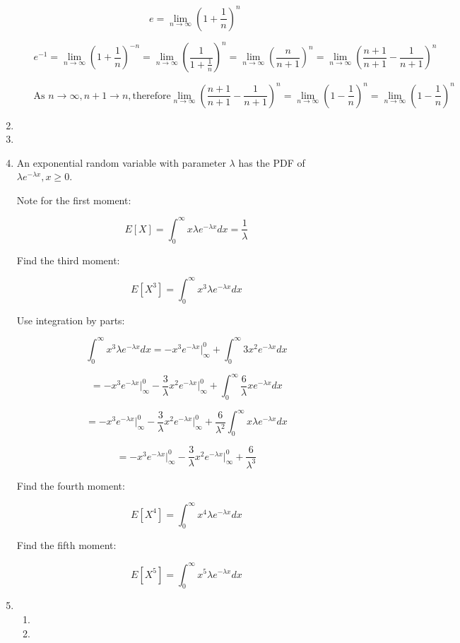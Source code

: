 \documentclass[11pt,letterpaper,titlepage]{article}
\begin{document}
\begin{enumerate}
\begin{enumerate}
        $$ e = \lim_{n\to\infty} (1 + \frac{1}{n})^n $$
        
        $$ e^{-1} = \lim_{n\to\infty} (1 + \frac{1}{n})^{-n} = \lim_{n\to\infty} (\frac{1}{1+\frac{1}{n}})^{n} = \lim_{n\to\infty} (\frac{n}{n+1})^{n} = \lim_{n\to\infty} (\frac{n+1}{n+1} - \frac{1}{n+1})^{n} $$
        
        $$ \text{As } n \to\infty, n+1 \to n, \text{therefore} \lim_{n\to\infty} (\frac{n+1}{n+1} - \frac{1}{n+1})^{n} = \lim_{n\to\infty} (1 - \frac{1}{n})^{n} = \lim_{n\to\infty} (1-\frac{1}{n})^n $$ 
        
    \end{enumerate}
    
    \item
    
    \item 
    
    \item An exponential random variable with parameter $ \lambda $ has the PDF of $ \lambda e^{-\lambda x}, x \geq 0 $.
    
    Note for the first moment:
    
    $$ E[X] = \int_{0}^{\infty} x \lambda e^{-\lambda x} dx = \frac{1}{\lambda} $$
    
    Find the third moment:
    
    $$ E[X^3] = \int_{0}^{\infty} x^3 \lambda e^{-\lambda x} dx $$
    
    Use integration by parts:
    
    $$ \int_{0}^{\infty} x^3 \lambda e^{-\lambda x} dx = -x^3 e^{-\lambda x}\big|_{\infty}^{0} + \int_{0}^{\infty} 3x^2 e^{-\lambda x} dx $$
    
    $$ = -x^3 e^{-\lambda x}\big|_{\infty}^{0} - \frac{3}{\lambda} x^2 e^{-\lambda x}\big|_{\infty}^{0} + \int_{0}^{\infty} \frac{6}{\lambda} x e^{-\lambda x} dx $$
    
    $$ = -x^3 e^{-\lambda x}\big|_{\infty}^{0} - \frac{3}{\lambda} x^2 e^{-\lambda x}\big|_{\infty}^{0} + \frac{6}{\lambda^2} \int_{0}^{\infty} x \lambda e^{-\lambda x} dx $$
    
    $$ = -x^3 e^{-\lambda x}\big|_{\infty}^{0} - \frac{3}{\lambda} x^2 e^{-\lambda x}\big|_{\infty}^{0} + \frac{6}{\lambda^3} $$
    
    Find the fourth moment:
    
    $$ E[X^4] = \int_{0}^{\infty} x^4 \lambda e^{-\lambda x} dx $$
    
    Find the fifth moment:
    
    $$ E[X^5] = \int_{0}^{\infty} x^5 \lambda e^{-\lambda x} dx $$
    
    \item \begin{enumerate}
        \item 
        
        \item
        
    \end{enumerate}
    
\end{enumerate}
\end{document}
